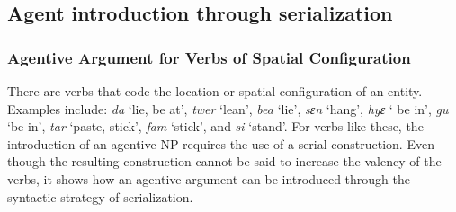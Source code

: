 \documentclass[output=paper]{langsci/langscibook}
\begin{document}
\ea
\label{ex:43.osam}
	\z

	\z
\z


\subsection{Agent introduction through serialization}\label{§5.2:agent.osam}
\subsubsection{Agentive Argument for Verbs of Spatial Configuration}\label{§5.2.1:agentive.osam}

There are verbs that code the location or spatial configuration of an entity. Examples  include: \textit{da} `lie, be at', \textit{twer} `lean', \textit{bea} `lie', \textit{sɛn} `hang', \textit{hyɛ} ` be in', \textit{gu} `be in', \textit{tar} `paste, stick', \textit{fam} `stick', and \textit{si} `stand'. For verbs like these, the introduction of an agentive NP requires the use of a serial construction. Even though the resulting construction cannot be said to increase the valency of the verbs, it shows how an agentive argument can be introduced through the syntactic strategy of serialization.

\ea
\label{ex:44.osam}
	\z

	\z
\z
\end{document}
